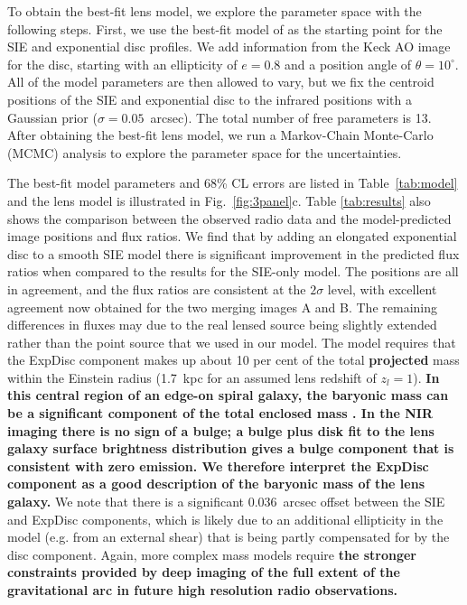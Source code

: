 \documentclass[a4paper,fleqn,usenatbib,useAMS]{mnras}
\begin{document}
To obtain the best-fit lens model, we explore the parameter space with the following steps. First, we use the best-fit model of \citet{Marlow99} as the starting point for the SIE and exponential disc profiles. We add information from the Keck AO image for the disc, starting with an ellipticity of $e=0.8$ and a position angle of $\theta=10^\circ$.  All of the model parameters are then allowed to vary, but we fix the centroid positions of the SIE and exponential disc to the infrared positions with a Gaussian prior ($\sigma = 0.05 $~arcsec). The total number of free parameters is 13. After obtaining the best-fit lens model, we run a Markov-Chain Monte-Carlo (MCMC) analysis to explore the parameter space for the uncertainties.

The best-fit model parameters and 68\% CL errors are listed in Table~\ref{tab:model} and the lens model is illustrated in Fig.~\ref{fig:3panel}c. Table \ref{tab:results} also shows the comparison between the observed radio data and the model-predicted image positions and flux ratios. We find that by adding an elongated exponential disc to a smooth SIE model there is significant improvement in the predicted flux ratios when compared to the results for the SIE-only model. 
The positions are all in agreement, and the flux ratios are consistent at the $2\sigma$ level, with excellent agreement now obtained for the two merging images A and B. The remaining differences in fluxes may due to the real lensed source being slightly extended rather than the point source that we used in our model. The model requires that the ExpDisc component makes up about 10 per cent of the total {\bf projected} mass within the Einstein radius (1.7~kpc for an assumed lens redshift of $z_l = 1$).  {\bf In this central region of an edge-on spiral galaxy, the baryonic mass can be a significant component of the total enclosed mass \citep[e.g.][]{swells2}.  In the NIR imaging there is no sign of a bulge; a bulge plus disk fit to the lens galaxy surface brightness distribution gives a bulge component that is consistent with zero emission.  We therefore interpret the ExpDisc component as a good description of the baryonic mass of the lens galaxy.}  We note that there is a significant 0.036~arcsec offset between the SIE and ExpDisc components, which is likely due to an additional ellipticity in the model (e.g. from an external shear) that is being partly compensated for by the disc component. Again, more complex mass models require {\bf the stronger constraints provided by deep imaging of the full extent of the gravitational arc in future high resolution radio observations.}
\end{document}
